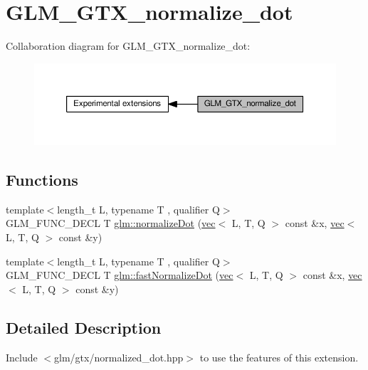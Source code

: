 \hypertarget{group__gtx__normalize__dot}{}\section{G\+L\+M\+\_\+\+G\+T\+X\+\_\+normalize\+\_\+dot}
\label{group__gtx__normalize__dot}
Collaboration diagram for G\+L\+M\+\_\+\+G\+T\+X\+\_\+normalize\+\_\+dot\+:
\nopagebreak
\begin{figure}[H]
\begin{center}
\leavevmode
\includegraphics[width=350pt]{dc/d5a/group__gtx__normalize__dot}
\end{center}
\end{figure}
\subsection*{Functions}
\begin{DoxyCompactItemize}
\item 
{\footnotesize template$<$length\+\_\+t L, typename T , qualifier Q$>$ }\\G\+L\+M\+\_\+\+F\+U\+N\+C\+\_\+\+D\+E\+CL T \hyperlink{group__gtx__normalize__dot_gacb140a2b903115d318c8b0a2fb5a5daa}{glm\+::normalize\+Dot} (\hyperlink{structglm_1_1vec}{vec}$<$ L, T, Q $>$ const \&x, \hyperlink{structglm_1_1vec}{vec}$<$ L, T, Q $>$ const \&y)
\item 
{\footnotesize template$<$length\+\_\+t L, typename T , qualifier Q$>$ }\\G\+L\+M\+\_\+\+F\+U\+N\+C\+\_\+\+D\+E\+CL T \hyperlink{group__gtx__normalize__dot_ga2746fb9b5bd22b06b2f7c8babba5de9e}{glm\+::fast\+Normalize\+Dot} (\hyperlink{structglm_1_1vec}{vec}$<$ L, T, Q $>$ const \&x, \hyperlink{structglm_1_1vec}{vec}$<$ L, T, Q $>$ const \&y)
\end{DoxyCompactItemize}


\subsection{Detailed Description}
Include $<$glm/gtx/normalized\+\_\+dot.\+hpp$>$ to use the features of this extension.

